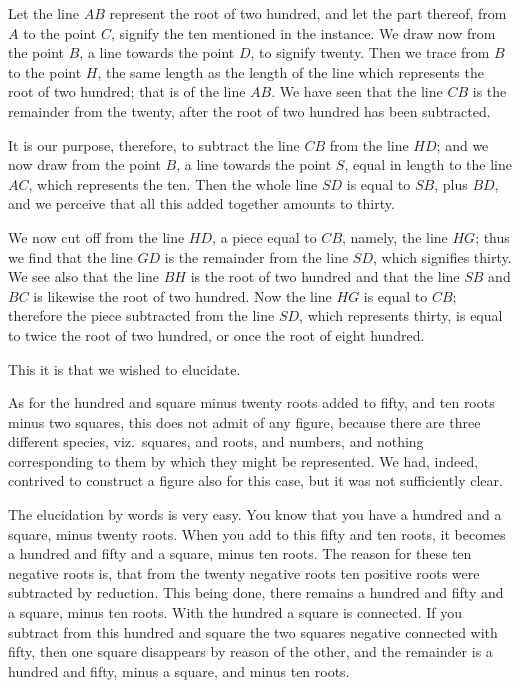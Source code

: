 Let the line $AB$ represent the root of two hundred, and let the part thereof, from $A$ to the point $C$, signify the ten mentioned in the instance. We draw now from the point $B$, a line towards the point $D$, to signify twenty. Then we trace from $B$ to the point $H$, the same length as the length of the line which represents the root of two hundred; that is of the line $AB$. We have seen that the line $CB$ is the remainder from the twenty, after the root of two hundred has been subtracted.

It is our purpose, therefore, to subtract the line $CB$ from the line $HD$; and we now draw from the point $B$, a line towards the point $S$, equal in length to the line $AC$, which represents the ten. Then the whole line $SD$ is equal to $SB$, plus $BD$, and we perceive that all this added together amounts to thirty.

We now cut off from the line $HD$, a piece equal to $CB$, namely, the line $HG$; thus we find that the line $GD$ is the remainder from the line $SD$, which signifies thirty. We see also that the line $BH$ is the root of two hundred and that the line $SB$ and $BC$ is likewise the root of two hundred. Now the line $HG$ is equal to $CB$; therefore the piece subtracted from the line $SD$, which represents thirty, is equal to twice the root of two hundred, or once the root of eight hundred.

This it is that we wished to elucidate.

\vspace{0.3cm}
As for the hundred and square minus twenty roots added to fifty, and ten roots minus two squares, this does not admit of any figure, because there are three different species, viz.~squares, and roots, and numbers, and nothing corresponding to them by which they might be represented. We had, indeed, contrived to construct a figure also for this case, but it was not sufficiently clear.

The elucidation by words is very easy. You know that you have a hundred and a square, minus twenty roots. When you add to this fifty and ten roots, it becomes a hundred and fifty and a square, minus ten roots. The reason for these ten negative roots is, that from the twenty negative roots ten positive roots were subtracted by reduction. This being done, there remains a hundred and fifty and a square, minus ten roots. With the hundred a square is connected. If you subtract from this hundred and square the two squares negative connected with fifty, then one square disappears by reason of the other, and the remainder is a hundred and fifty, minus a square, and minus ten roots.

